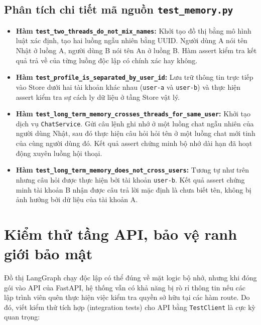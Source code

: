 \subsection{Phân tích chi tiết mã nguồn \texttt{test\_memory.py}}
\begin{itemize}
  \item \textbf{Hàm \texttt{test\_two\_threads\_do\_not\_mix\_names}:} Khởi tạo đồ thị bằng mô hình luật xác định, tạo hai luồng ngẫu nhiên bằng UUID. Người dùng A nói tên Nhật ở luồng A, người dùng B nói tên An ở luồng B. Hàm assert kiểm tra kết quả trả về của từng luồng độc lập có chính xác hay không.
  \item \textbf{Hàm \texttt{test\_profile\_is\_separated\_by\_user\_id}:} Lưu trữ thông tin trực tiếp vào Store dưới hai tài khoản khác nhau (\texttt{user-a} và \texttt{user-b}) và thực hiện assert kiểm tra sự cách ly dữ liệu ở tầng Store vật lý.
  \item \textbf{Hàm \texttt{test\_long\_term\_memory\_crosses\_threads\_for\_same\_user}:} Khởi tạo dịch vụ \texttt{ChatService}. Gửi câu lệnh ghi nhớ ở một luồng chat ngẫu nhiên của người dùng Nhật, sau đó thực hiện câu hỏi hỏi tên ở một luồng chat mới tinh của cùng người dùng đó. Kết quả assert chứng minh bộ nhớ dài hạn đã hoạt động xuyên luồng hội thoại.
  \item \textbf{Hàm \texttt{test\_long\_term\_memory\_does\_not\_cross\_users}:} Tương tự như trên nhưng câu hỏi được thực hiện bởi tài khoản \texttt{user-b}. Kết quả assert chứng minh tài khoản B nhận được câu trả lời mặc định là chưa biết tên, không bị ảnh hưởng bởi dữ liệu của tài khoản A.
\end{itemize}

\section{Kiểm thử tầng API, bảo vệ ranh giới bảo mật}

Đồ thị LangGraph chạy độc lập có thể đúng về mặt logic bộ nhớ, nhưng khi đóng gói vào API của FastAPI, hệ thống vẫn có khả năng bị rò rỉ thông tin nếu các lập trình viên quên thực hiện việc kiểm tra quyền sở hữu tại các hàm route. Do đó, viết kiểm thử tích hợp (integration tests) cho API bằng \texttt{TestClient} là cực kỳ quan trọng:

\begingroup

\endgroup

